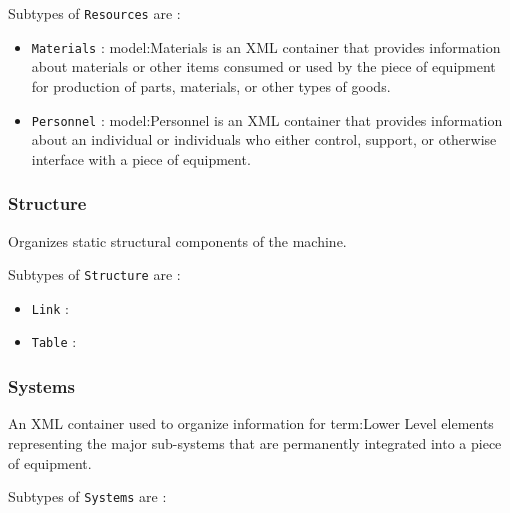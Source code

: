 Subtypes of \texttt{Resources} are :

\begin{itemize}
\item \texttt{Materials} : {model:Materials} is an XML container that provides information about materials or other items consumed or used by the piece of equipment for production of parts, materials, or other types of goods.

\item \texttt{Personnel} : {model:Personnel} is an XML container that provides information about an individual or individuals who either control, support, or otherwise interface with a piece of equipment.


\end{itemize}

\FloatBarrier

\subsubsection{Structure}
  \label{sec:Structure}


Organizes static structural components of the machine.

Subtypes of \texttt{Structure} are :

\begin{itemize}
\item \texttt{Link} : 

\item \texttt{Table} : 

\end{itemize}

\FloatBarrier

\subsubsection{Systems}
  \label{sec:Systems}


An XML container used to organize information for {term:Lower Level} elements representing the major sub-systems that are permanently integrated into a piece of equipment.

Subtypes of \texttt{Systems} are :

